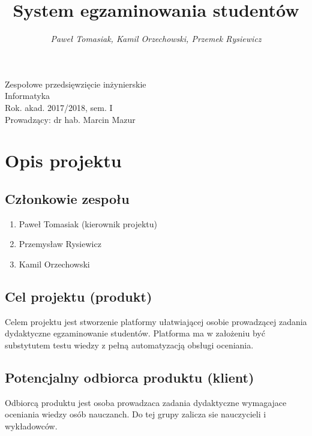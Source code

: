 \documentclass[a4paper]{article}
\title{\bf{System egzaminowania studentów}}
\author{{\em Paweł Tomasiak, Kamil Orzechowski, Przemek Rysiewicz}}
\date{}
\begin{document}
\begin{titlepage}
\maketitle
\thispagestyle{empty}
\bigskip
\begin{center}
Zespołowe przedsięwzięcie inżynierskie\\[2mm]

Informatyka\\[2mm]

Rok. akad. 2017/2018, sem. I\\[2mm]

Prowadzący: dr hab. Marcin Mazur
\end{center}
\end{titlepage}

\tableofcontents
\thispagestyle{empty}

\newpage

\section{Opis projektu}

\subsection{Członkowie zespołu}

\begin{enumerate}
\item Paweł Tomasiak (kierownik projektu)
\item Przemysław Rysiewicz
\item Kamil Orzechowski
\end{enumerate}

\subsection{Cel projektu (produkt)}

Celem projektu jest stworzenie platformy ułatwiającej osobie prowadzącej zadania dydaktyczne egzaminowanie studentów. Platforma ma w założeniu być substytutem testu wiedzy z pełną automatyzacją obsługi oceniania.

\subsection{Potencjalny odbiorca produktu (klient)}

Odbiorcą produktu jest osoba prowadzaca zadania dydaktyczne wymagajace oceniania wiedzy osób nauczanch. Do tej grupy zalicza sie nauczycieli i wykładowców.
\end{document}

